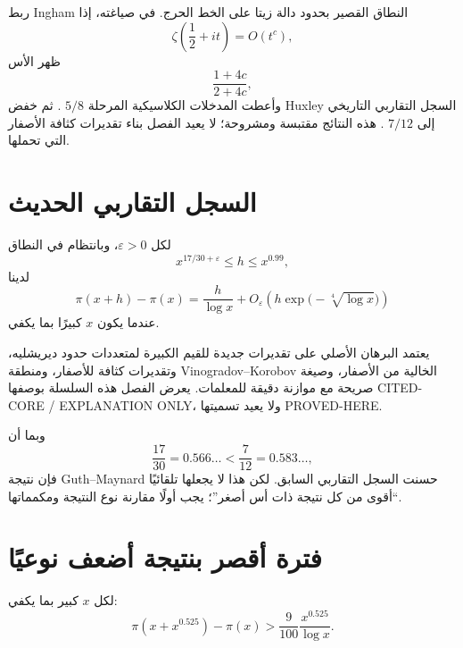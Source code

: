 ربط Ingham النطاق القصير بحدود دالة زيتا على الخط الحرج. في صياغته، إذا
\[
\zeta\!\left(\frac12+it\right)=O(t^c),
\]
ظهر الأس
\[
\frac{1+4c}{2+4c},
\]
وأعطت المدخلات الكلاسيكية المرحلة \(5/8\) \cite[Theorem~1]{Ingham1937}. ثم خفض Huxley السجل التقاربي التاريخي إلى \(7/12\) \cite{Huxley1972}. هذه النتائج مقتبسة ومشروحة؛ لا يعيد الفصل بناء تقديرات كثافة الأصفار التي تحملها.

\section{السجل التقاربي الحديث}

\begin{theorem}
\label{thm:guth-maynard-short-intervals}
لكل \(\varepsilon>0\)، وبانتظام في النطاق
\[
x^{17/30+\varepsilon}\le h\le x^{0.99},
\]
لدينا
\[
\pi(x+h)-\pi(x)
=
\frac{h}{\log x}
+O_\varepsilon\!\left(
h\exp\!\bigl(-\sqrt[4]{\log x}\bigr)
\right)
\]
عندما يكون \(x\) كبيرًا بما يكفي.
\end{theorem}

يعتمد البرهان الأصلي على تقديرات جديدة للقيم الكبيرة لمتعددات حدود ديريشليه، وتقديرات كثافة للأصفار، ومنطقة Vinogradov--Korobov الخالية من الأصفار، وصيغة صريحة مع موازنة دقيقة للمعلمات. يعرض الفصل هذه السلسلة بوصفها \textenglish{CITED-CORE / EXPLANATION ONLY}، ولا يعيد تسميتها \textenglish{PROVED-HERE}.

وبما أن
\[
\frac{17}{30}=0.566\ldots<\frac{7}{12}=0.583\ldots,
\]
فإن نتيجة Guth--Maynard حسنت السجل التقاربي السابق. لكن هذا لا يجعلها تلقائيًا ``أقوى من كل نتيجة ذات أس أصغر''؛ يجب أولًا مقارنة نوع النتيجة ومكمماتها.

\section{فترة أقصر بنتيجة أضعف نوعيًا}

\begin{theorem}
\label{thm:bhp-short-interval-lower-bound}
لكل \(x\) كبير بما يكفي:
\[
\pi\!\left(x+x^{0.525}\right)-\pi(x)
>
\frac{9}{100}\frac{x^{0.525}}{\log x}.
\]
\end{theorem}

